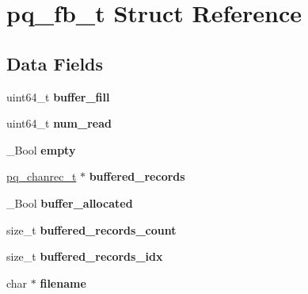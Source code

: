 \hypertarget{structpq__fb__t}{}\section{pq\+\_\+fb\+\_\+t Struct Reference}
\label{structpq__fb__t}
\subsection*{Data Fields}
\begin{DoxyCompactItemize}
\item 
\hypertarget{structpq__fb__t_a7c7c8e0765c162f77155fa19fb53a3c5}{}uint64\+\_\+t {\bfseries buffer\+\_\+fill}\label{structpq__fb__t_a7c7c8e0765c162f77155fa19fb53a3c5}

\item 
\hypertarget{structpq__fb__t_a4893132bc6af39eff28a6ec76dcd3312}{}uint64\+\_\+t {\bfseries num\+\_\+read}\label{structpq__fb__t_a4893132bc6af39eff28a6ec76dcd3312}

\item 
\hypertarget{structpq__fb__t_aa6b8566db3cfbcb5f0da789fe084a2f0}{}\+\_\+\+Bool {\bfseries empty}\label{structpq__fb__t_aa6b8566db3cfbcb5f0da789fe084a2f0}

\item 
\hypertarget{structpq__fb__t_a63fb8db00db71bb17695283f132d6d0e}{}\hyperlink{structpq__chanrec__t}{pq\+\_\+chanrec\+\_\+t} $\ast$ {\bfseries buffered\+\_\+records}\label{structpq__fb__t_a63fb8db00db71bb17695283f132d6d0e}

\item 
\hypertarget{structpq__fb__t_a12696d8718d32ab8f04e1d4fd47e164a}{}\+\_\+\+Bool {\bfseries buffer\+\_\+allocated}\label{structpq__fb__t_a12696d8718d32ab8f04e1d4fd47e164a}

\item 
\hypertarget{structpq__fb__t_a3c631d15f3359c5a881539c5e01bb9b2}{}size\+\_\+t {\bfseries buffered\+\_\+records\+\_\+count}\label{structpq__fb__t_a3c631d15f3359c5a881539c5e01bb9b2}

\item 
\hypertarget{structpq__fb__t_aa0a1a7dbae433b1361bcc6c6ecbc19e0}{}size\+\_\+t {\bfseries buffered\+\_\+records\+\_\+idx}\label{structpq__fb__t_aa0a1a7dbae433b1361bcc6c6ecbc19e0}

\item 
\hypertarget{structpq__fb__t_ad270be9b4551c618826edab65d9c6d7a}{}char $\ast$ {\bfseries filename}\label{structpq__fb__t_ad270be9b4551c618826edab65d9c6d7a}


\end{DoxyCompactItemize}
